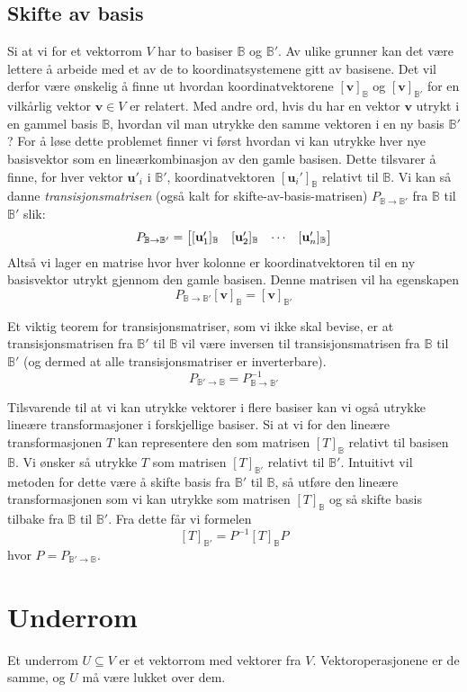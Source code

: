 \documentclass[12pt,a4paper,norsk]{article}
\makeatletter
\newcommand{\B}{\mathbb{B}}
\newcommand{\mat}[2]{\left[\begin{array}{@{}#1@{}}#2\end{array}\right]}
\newcommand{\vv}{\textbf{v}}
\newcommand{\vu}{\textbf{u}}
\makeatother
\begin{document}
\subsection{Skifte av basis}
Si at vi for et vektorrom $V$ har to basiser $\B$ og $\B'$. Av ulike grunner kan
det være lettere å arbeide med et av de to koordinatsystemene gitt av basisene.
Det vil derfor være ønskelig å finne ut hvordan koordinatvektorene $[\vv]_\B$ og
$[\vv]_{\B'}$ for en vilkårlig vektor $\vv \in V$ er relatert. 
Med andre ord, hvis du har en vektor $\vv$ utrykt i en gammel basis $\B$,
hvordan vil man utrykke den samme vektoren i en ny basis $\B'$? 
For å løse dette problemet finner vi først hvordan vi kan utrykke hver nye
basisvektor som en lineærkombinasjon av den gamle basisen. Dette tilsvarer å
finne, for hver vektor $\vu'_i$ i $\B'$, koordinatvektoren $[\vu_i']_\B$
relativt til $\B$. Vi kan så danne \textit{transisjonsmatrisen} (også kalt for
skifte-av-basis-matrisen)  $P_{\B\rightarrow\B'}$ fra $\B$ til $\B'$ slik: 
\[P_{\B\rightarrow\B'} = \mat{cccc}{[\vu_1']_\B & [\vu_2']_\B & \cdots & [\vu_n']_\B}\]
Altså vi lager en matrise hvor hver kolonne er koordinatvektoren til en ny
basisvektor utrykt gjennom den gamle basisen. Denne matrisen vil ha egenskapen 
\[P_{\B\rightarrow\B'}[\vv]_\B = [\vv]_{\B'}\]

Et viktig teorem for transisjonsmatriser, som vi ikke skal bevise, er at
transisjonsmatrisen fra $\B'$ til $\B$ vil være inversen til transisjonsmatrisen
fra $\B$ til $\B'$ (og dermed at alle transisjonsmatriser er inverterbare). 
\[P_{\B'\rightarrow\B} = P_{\B\rightarrow\B'}^{-1}\]

Tilsvarende til at vi kan utrykke vektorer i flere basiser kan vi også utrykke
lineære transformasjoner i forskjellige basiser. Si at vi for den lineære
transformasjonen $T$ kan representere den som matrisen $[T]_\B$ relativt til
basisen $\B$. Vi ønsker så utrykke $T$ som matrisen $[T]_{\B'}$ relativt til
$\B'$. Intuitivt vil metoden for dette være å skifte basis fra $\B'$ til $\B$,
så utføre den lineære transformasjonen som vi kan utrykke som matrisen $[T]_\B$
og så skifte basis tilbake fra $\B$ til $\B'$. Fra dette får vi formelen 
\[[T]_{\B'}=P^{-1}[T]_\B P\]
hvor $P=P_{\B'\rightarrow\B}$.

\section{Underrom}
Et underrom $U \subseteq V$ er et vektorrom med vektorer fra $V$.
Vektoroperasjonene er de samme, og $U$ må være lukket over dem.
\end{document}
